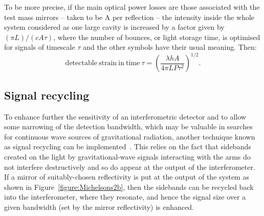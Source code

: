 \documentclass{article}
\begin{document}

To be more precise, if the main optical power losses are those associated with
the test mass mirrors -- taken to be A per reflection -- the intensity inside
the whole system considered as one large cavity is increased by a factor given
by $(\pi L)/(c A \tau)$, where the number of bounces, or light storage time, is
optimised for signals of timescale $\tau$ and the other symbols have their usual
meaning. Then:
%
\begin{equation}
  \mathrm{detectable\ strain\ in\ time\ } \tau = \left( \frac{\lambda h
  A}{4 \pi L P \tau^2} \right)^{1/2}.
  \label{equation:shotpower}
\end{equation}


\subsection{Signal recycling}
\label{subsection:sigrec}

To enhance further the sensitivity of an interferometric detector and to allow
some narrowing of the detection bandwidth, which may be valuable in searches for
continuous wave sources of gravitational radiation, another technique known as
signal recycling can be implemented~\cite{Meers, Strain, Heinzel}. This relies
on the fact that sidebands created on the light by gravitational-wave signals
interacting with the arms do not interfere destructively and so do appear at the
output of the interferometer. If a mirror of suitably-chosen reflectivity is put
at the output of the system as shown in Figure~\ref{figure:Michelsons2b}, then the
sidebands can be recycled back into the interferometer, where they resonate, and
hence the signal size over a given bandwidth (set by the mirror reflectivity) is
enhanced.
\end{document}
